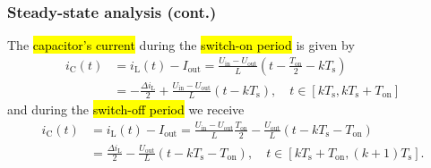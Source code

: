 \begin{frame}
    \frametitle{Steady-state analysis (cont.)}
     The \hl{capacitor's current} during the \hl{switch-on period} is given by
    \begin{equation}
        \begin{split}
            i_\mathrm{C}(t) &= i_\mathrm{L}(t) - I_\mathrm{out} = \frac{U_\mathrm{in}-U_\mathrm{out}}{L} (t - \frac{T_\mathrm{on}}{2}-k T_\mathrm{s})\\
                            &= -\frac{\Delta i_\mathrm{L}}{2} + \frac{U_\mathrm{in}-U_\mathrm{out}}{L} (t -k T_\mathrm{s}), \quad t\in [k T_\mathrm{s}, k T_\mathrm{s} + T_\mathrm{on}]
        \end{split}
        \label{eq:capacitor-current-switch-on-step-down-converter}
    \end{equation}
    and during the \hl{switch-off period} we receive
    \begin{equation}
        \begin{split}
            i_\mathrm{C}(t) &= i_\mathrm{L}(t) - I_\mathrm{out} = \frac{U_\mathrm{in} - U_\mathrm{out}}{L} \frac{T_\mathrm{on}}{2} -\frac{U_\mathrm{out}}{L} (t - k T_\mathrm{s} - T_\mathrm{on})\\
                            &= \frac{\Delta i_\mathrm{L}}{2} - \frac{U_\mathrm{out}}{L} (t - k T_\mathrm{s} - T_\mathrm{on}), \quad t\in [k T_\mathrm{s} + T_\mathrm{on}, (k+1) T_\mathrm{s}].
        \end{split}
        \label{eq:capacitor-current-switch-off-step-down-converter}
    \end{equation}
\end{frame}


